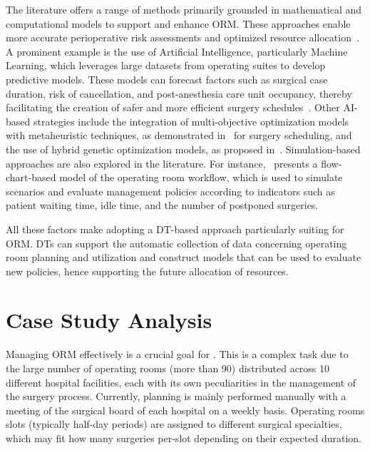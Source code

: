 The literature offers a range of methods primarily grounded in mathematical and computational models to support and enhance ORM.
%
These approaches enable more accurate perioperative risk assessments and optimized resource allocation~\cite{Zhu2019}.
%
A prominent example is the use of Artificial Intelligence, particularly Machine Learning, which leverages large datasets from operating suites to develop predictive models.
%
These models can forecast factors such as surgical case duration, risk of cancellation, and post-anesthesia care unit occupancy, thereby facilitating the creation of safer and more efficient surgery schedules~\cite{Fairley2019, luo2020hij}.
%
Other AI-based strategies include the integration of multi-objective optimization models with metaheuristic techniques, as demonstrated in~\cite{aringhieri2022eor} for surgery scheduling, and the use of hybrid genetic optimization models, as proposed in~\cite{GUIDO2017}.
%
Simulation-based approaches are also explored in the literature.
%
For instance,~\cite{Schoenfelder2021} presents a flow-chart-based model of the operating room workflow, which is used to simulate scenarios and evaluate management policies according to indicators such as patient waiting time, idle time, and the number of postponed surgeries.

All these factors make adopting a \ac{DT}-based approach particularly suiting for ORM.
%
\acp{DT} can support the automatic collection of data concerning operating room planning and utilization and construct models that can be used to evaluate new policies, hence supporting the future allocation of resources.

\section{Case Study Analysis}



Managing ORM effectively is a crucial goal for \ausl{}. 
This is a complex task due to the large number of operating rooms (more than 90) distributed across 10 different hospital facilities, each with its own peculiarities in the management of the surgery process.
%
Currently, planning is mainly performed manually with a meeting of the surgical board of each hospital on a weekly basis.
%
Operating rooms slots (typically half-day periods) are assigned to different surgical specialties, which may fit how many surgeries per-slot depending on their expected duration. 

